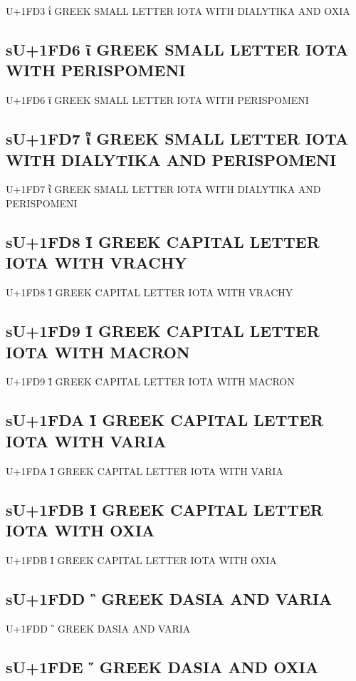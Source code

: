 U+1FD3 ΐ GREEK SMALL LETTER IOTA WITH DIALYTIKA AND OXIA

\subsection{sU+1FD6 ῖ GREEK SMALL LETTER IOTA WITH PERISPOMENI}

U+1FD6 ῖ GREEK SMALL LETTER IOTA WITH PERISPOMENI

\subsection{sU+1FD7 ῗ GREEK SMALL LETTER IOTA WITH DIALYTIKA AND PERISPOMENI}

U+1FD7 ῗ GREEK SMALL LETTER IOTA WITH DIALYTIKA AND PERISPOMENI

\subsection{sU+1FD8 Ῐ GREEK CAPITAL LETTER IOTA WITH VRACHY}

U+1FD8 Ῐ GREEK CAPITAL LETTER IOTA WITH VRACHY

\subsection{sU+1FD9 Ῑ GREEK CAPITAL LETTER IOTA WITH MACRON}

U+1FD9 Ῑ GREEK CAPITAL LETTER IOTA WITH MACRON

\subsection{sU+1FDA Ὶ GREEK CAPITAL LETTER IOTA WITH VARIA}

U+1FDA Ὶ GREEK CAPITAL LETTER IOTA WITH VARIA

\subsection{sU+1FDB Ί GREEK CAPITAL LETTER IOTA WITH OXIA}

U+1FDB Ί GREEK CAPITAL LETTER IOTA WITH OXIA

\subsection{sU+1FDD ῝ GREEK DASIA AND VARIA}

U+1FDD ῝ GREEK DASIA AND VARIA

\subsection{sU+1FDE ῞ GREEK DASIA AND OXIA}


